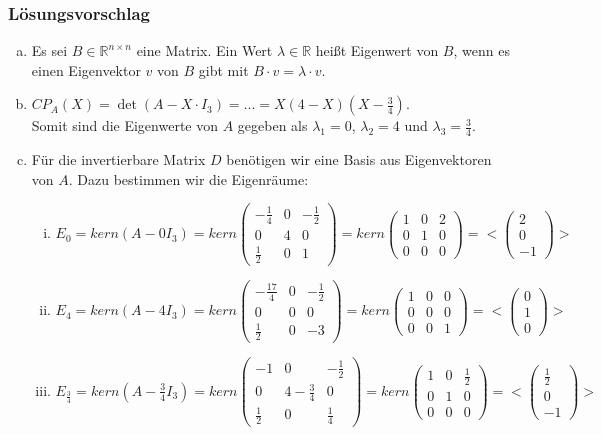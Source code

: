 \documentclass[a4paper,11pt]{scrartcl}
\newcommand{\RR}{\mathbb{R}}
\begin{document}
\subsubsection*{Lösungsvorschlag}
\begin{enumerate}[a)]
\item Es sei $B\in\RR^{n\times n}$ eine Matrix. Ein Wert $\lambda \in \RR$ heißt Eigenwert von $B$, wenn es einen Eigenvektor $v$ von $B$ gibt mit $B\cdot v = \lambda\cdot v$.
\item $CP_A(X)=\det(A-X\cdot I_3)=...=X(4-X)(X-\frac{3}{4})$. \\
Somit sind die Eigenwerte von $A$ gegeben als $\lambda_1=0$, $\lambda_2=4$ und $\lambda_3=\frac{3}{4}$.
\item Für die invertierbare Matrix $D$ benötigen wir eine Basis aus Eigenvektoren von $A$. Dazu bestimmen wir die Eigenräume:
\begin{enumerate}[i)]
\item $E_0=kern(A-0I_3)=kern\begin{pmatrix} -\frac{1}{4} & 0 & -\frac{1}{2} \\ 0 & 4 & 0 \\ \frac{1}{2} & 0 &1 \end{pmatrix}=kern\begin{pmatrix} 1 & 0 & 2 \\ 0 & 1 & 0 \\ 0 & 0 &0 \end{pmatrix}=<\begin{pmatrix} 2\\0\\-1 \end{pmatrix}>$
\item $E_4=kern(A-4I_3)=kern\begin{pmatrix} -\frac{17}{4} & 0 & -\frac{1}{2} \\ 0 & 0 & 0 \\ \frac{1}{2} & 0 &-3 \end{pmatrix}=kern\begin{pmatrix} 1 & 0 & 0 \\ 0 & 0 & 0 \\ 0 & 0 &1 \end{pmatrix}=<\begin{pmatrix} 0\\1\\0 \end{pmatrix}>$
\item $E_\frac{3}{4}=kern(A-\frac{3}{4}I_3)=kern\begin{pmatrix} -1 & 0 & -\frac{1}{2} \\ 0 & 4-\frac{3}{4} & 0 \\ \frac{1}{2} & 0 &\frac{1}{4} \end{pmatrix}=kern\begin{pmatrix} 1 & 0 & \frac{1}{2} \\ 0 & 1 & 0 \\ 0 & 0 &0 \end{pmatrix}=<\begin{pmatrix} \frac{1}{2}\\0\\-1 \end{pmatrix}>$

\end{enumerate}
\end{enumerate}
\end{document}
